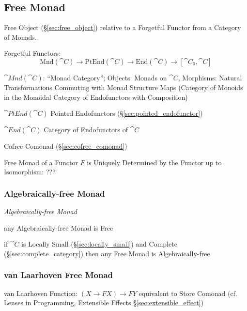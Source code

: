 \subsection{Free Monad}\label{sec:free_monad}

Free Object (\S\ref{sec:free_object}) relative to a Forgetful Functor
from a Category of Monads.

Forgetful Functors:
\[
  \mathrm{Mnd}(\cat{C}) \rightarrow \mathrm{PtEnd}(\cat{C})
  \rightarrow \mathrm{End}(\cat{C}) \rightarrow [\cat{C}_0, \cat{C}]
\]

$\cat{Mnd}(\cat{C})$: ``Monad Category''; Objects: Monads on
$\cat{C}$, Morphisms: Natural Transformations Commuting with Monad
Structure Maps (Category of Monoids in the Monoidal Category of
Endofunctors with Composition)

$\cat{PtEnd}(\cat{C})$ Pointed Endofunctors
(\S\ref{sec:pointed_endofunctor})

$\cat{End}(\cat{C})$ Category of Endofunctors of $\cat{C}$

Cofree Comonad (\S\ref{sec:cofree_comonad})

Free Monad of a Functor $F$ is Uniquely Determined by the Functor up
to Isomorphism: ??? %



\subsubsection{Algebraically-free Monad}\label{sec:algebraically_free}

\emph{Algebraically-free Monad}

any Algebraically-free Monad is Free

if $\cat{C}$ is Locally Small (\S\ref{sec:locally_small}) and Complete
(\S\ref{sec:complete_category}) then any Free Monad is
Algebraically-free



\subsubsection{van Laarhoven Free Monad}
\label{sec:vanlaarhoven_free_monad}

van Laarhoven Function: $(X \rightarrow F X) \rightarrow F Y$
equivalent to Store Comonad (cf. Lenses in Programming, Extensible
Effects \S\ref{sec:extensible_effect})



